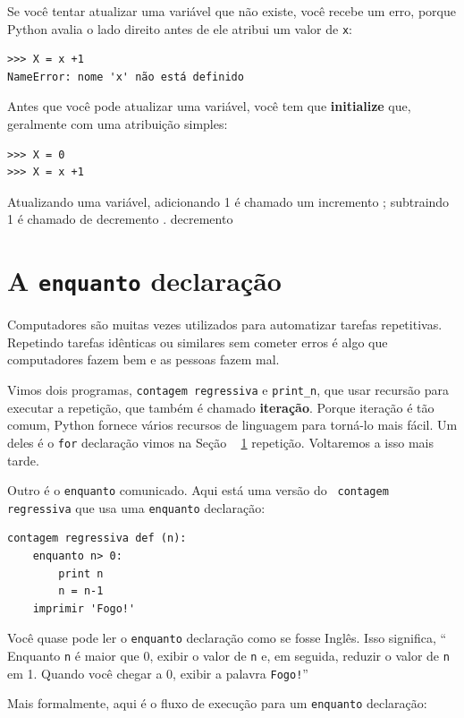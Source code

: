 \documentclass[10pt]{book}
\begin{document}
{{Se você tentar atualizar uma variável que não existe, você recebe um
erro, porque Python avalia o lado direito antes de ele atribui
um valor de {\tt x}:

\begin{verbatim}
>>> X = x +1
NameError: nome 'x' não está definido
\end{verbatim}
%
Antes que você pode atualizar uma variável, você tem que {\bf initialize}
que, geralmente com uma atribuição simples:

\begin{verbatim}
>>> X = 0
>>> X = x +1
\end{verbatim}
%
Atualizando uma variável, adicionando 1 é chamado um incremento {\bf};
subtraindo 1 é chamado de decremento {\bf}.
\index{} decremento




\section{A {\tt enquanto} declaração}

Computadores são muitas vezes utilizados para automatizar tarefas repetitivas. Repetindo
tarefas idênticas ou similares sem cometer erros é algo que
computadores fazem bem e as pessoas fazem mal.

Vimos dois programas, {\tt contagem regressiva} e \verb "print_n", que
usar recursão para executar a repetição, que também é chamado {\bf
iteração}. Porque iteração é tão comum, Python fornece vários
recursos de linguagem para torná-lo mais fácil. Um deles é o {\tt for} declaração
vimos na Seção ~ \ref {} repetição. Voltaremos a isso mais tarde.

Outro é o {\tt enquanto} comunicado. Aqui está uma versão do {\tt
contagem regressiva} que usa uma {\tt enquanto} declaração:

\begin{verbatim}
contagem regressiva def (n):
    enquanto n> 0:
        print n
        n = n-1
    imprimir 'Fogo!'
\end{verbatim}
%
Você quase pode ler o {\tt enquanto} declaração como se fosse Inglês.
Isso significa, `` Enquanto {\tt n} é maior que 0,
exibir o valor de {\tt n} e, em seguida, reduzir o valor de
{\tt n} em 1. Quando você chegar a 0, exibir a palavra {\tt Fogo!}''

Mais formalmente, aqui é o fluxo de execução para um {\tt enquanto} declaração:

}}
\end{document}
